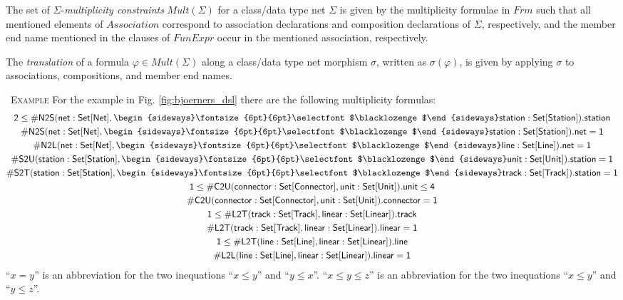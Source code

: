 \documentclass[10pt, a4paper]{isov2}
\renewenvironment{example}[0]{\ \newline \textsc{Example}\quad }{}
\newcommand{\composition}{\raisebox{0.2pt}{\begin{sideways}\fontsize{6pt}{6pt}\selectfont$\blacklozenge$\end{sideways}}}
\begin{document}
The set of $\Sigma$-\emph{multiplicity
  constraints} $\mathit{Mult}(\Sigma)$
for a class/data type net $\Sigma$
is given by the multiplicity formulae in $\mathit{Frm}$
such that all mentioned elements of $\mathit{Association}$
correspond to association declarations and composition declarations of
$\Sigma$,
respectively, and the member end name mentioned in the clauses of
$\mathit{FunExpr}$ occur in the mentioned association, respectively.

The \emph{translation} of a formula $\varphi \in \mathit{Mult}(\Sigma)$
along a class/data type net morphism $\sigma$, written as $\sigma(\varphi)$,
is given by applying $\sigma$ to associations, compositions, and member end
names.

\begin{example}
 For the example in Fig. \ref{fig:bjoerners_dsl} there are the following multiplicity formulas:
\begin{gather*}
  \mathsf{2 \leq \#N2S(net : Set[Net], \composition station : Set[Station]).station}
\\
  \mathsf{\#N2S(net : Set[Net], \composition station : Set[Station]).net = 1}
\\
  \mathsf{\#N2L(net : Set[Net], \composition line : Set[Line]).net = 1}
\\
  \mathsf{\#S2U(station : Set[Station], \composition unit : Set[Unit]).station = 1}
\\
  \mathsf{\#S2T(station : Set[Station], \composition track : Set[Track]).station = 1}
\\
  \mathsf{1 \leq \#C2U(connector : Set[Connector], unit : Set[Unit]).unit \leq 4}
\\
  \mathsf{\#C2U(connector : Set[Connector], unit : Set[Unit]).connector = 1}
\\
  \mathsf{1 \leq \#L2T(track : Set[Track], linear : Set[Linear]).track}
\\
  \mathsf{\#L2T(track : Set[Track], linear : Set[Linear]).linear = 1}
\\
  \mathsf{1 \leq \#L2T(line : Set[Line], linear : Set[Linear]).line}
\\
  \mathsf{\#L2L(line : Set[Line], linear : Set[Linear]).linear = 1}
\end{gather*}
%
 ``$x = y$'' is an  
abbreviation for the two inequations ``$x\leq y$'' and ``$y\leq x$''.
``$x \leq y \leq z$'' is an abbreviation for the two  inequations 
``$x\leq y$'' and ``$y\leq z$''.
\end{example}
\end{document}
